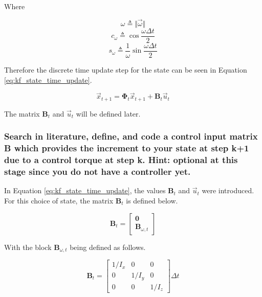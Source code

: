 Where

\begin{equation*}
    \omega \triangleq \Vert \vec{\omega} \Vert
\end{equation*}
\begin{equation*}
    c_{\omega} \triangleq \cos{\frac{\omega \Delta t}{2}}
\end{equation*}
\begin{equation*}
    s_{\omega} \triangleq \frac{1}{\omega} \sin{\frac{\omega \Delta t}{2}}
\end{equation*}

Therefore the discrete time update step for the state can be seen in Equation \ref{eq:kf_state_time_update}.

\begin{equation} \label{eq:kf_state_time_update}
    \vec{x}_{t + 1} = \boldsymbol{\Phi}_t \vec{x}_{t + 1} + \boldsymbol{B}_t \vec{u}_t
\end{equation}

The matrix $\boldsymbol{B}_t$ and $\vec{u}_t$ will be defined later.

\subsubsection{Search in literature, define, and code a control input matrix B which provides the increment to your state at step k+1 due to a control torque at step k. Hint: optional at this stage since you do not have a controller yet.}

In Equation \ref{eq:kf_state_time_update}, the values $\boldsymbol{B}_t$ and $\vec{u}_t$ were introduced. For this choice of state, the matrix $\boldsymbol{B}_t$ is defined below.

\begin{equation*}
    \boldsymbol{B}_t = \begin{bmatrix}
        \boldsymbol{0} \\
        \boldsymbol{B}_{\omega,t}
    \end{bmatrix}
\end{equation*}

With the block $\boldsymbol{B}_{\omega,t}$ being defined as follows.

\begin{equation*}
    \boldsymbol{B}_t = \begin{bmatrix}
        1/I_x & 0 & 0 \\
        0 & 1/I_y & 0 \\
        0 & 0 & 1/I_z
    \end{bmatrix} \Delta t
\end{equation*}

